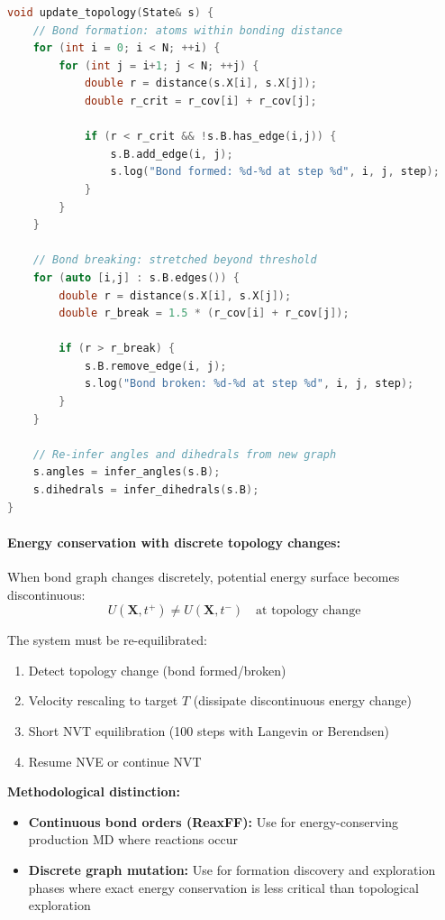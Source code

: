 \documentclass[11pt]{article}
\begin{document}
\begin{lstlisting}[language=C++]
void update_topology(State& s) {
    // Bond formation: atoms within bonding distance
    for (int i = 0; i < N; ++i) {
        for (int j = i+1; j < N; ++j) {
            double r = distance(s.X[i], s.X[j]);
            double r_crit = r_cov[i] + r_cov[j];
            
            if (r < r_crit && !s.B.has_edge(i,j)) {
                s.B.add_edge(i, j);
                s.log("Bond formed: %d-%d at step %d", i, j, step);
            }
        }
    }
    
    // Bond breaking: stretched beyond threshold
    for (auto [i,j] : s.B.edges()) {
        double r = distance(s.X[i], s.X[j]);
        double r_break = 1.5 * (r_cov[i] + r_cov[j]);
        
        if (r > r_break) {
            s.B.remove_edge(i, j);
            s.log("Bond broken: %d-%d at step %d", i, j, step);
        }
    }
    
    // Re-infer angles and dihedrals from new graph
    s.angles = infer_angles(s.B);
    s.dihedrals = infer_dihedrals(s.B);
}
\end{lstlisting}

\paragraph{Energy conservation with discrete topology changes:}

When bond graph changes discretely, potential energy surface becomes discontinuous:
\begin{equation}
U(\mathbf{X}, t^+) \neq U(\mathbf{X}, t^-) \quad \text{at topology change}
\end{equation}

The system must be re-equilibrated:

\begin{enumerate}
\item Detect topology change (bond formed/broken)
\item Velocity rescaling to target $T$ (dissipate discontinuous energy change)
\item Short NVT equilibration (100 steps with Langevin or Berendsen)
\item Resume NVE or continue NVT
\end{enumerate}

\textbf{Methodological distinction:}

\begin{itemize}
\item \textbf{Continuous bond orders (ReaxFF):} Use for energy-conserving production MD where reactions occur
\item \textbf{Discrete graph mutation:} Use for formation discovery and exploration phases where exact energy conservation is less critical than topological exploration
\end{itemize}
\end{document}
